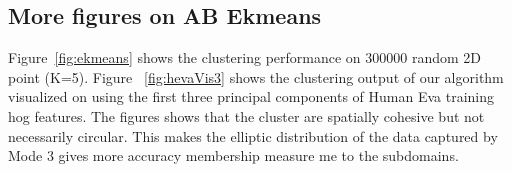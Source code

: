 \begin{appendices}

\section{More figures on AB Ekmeans}





 Figure~\ref{fig:ekmeans} shows the clustering performance on 300000 random 2D point (K=5). Figure  ~\ref{fig:hevaVis3} shows the clustering output of our algorithm visualized on using the first three principal components of Human Eva training hog features. The figures shows that the cluster are spatially cohesive but not necessarily circular. This makes the elliptic distribution of the data captured by Mode 3 gives more accuracy membership measure me to the subdomains. %
 
 


\end{appendices}
